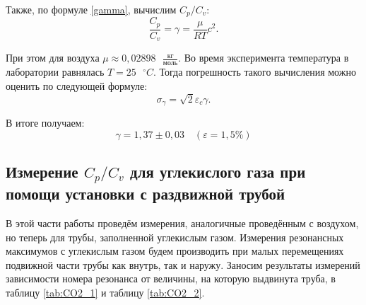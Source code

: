 \documentclass[a4paper, 12pt]{article}
\begin{document}
            \noindent Также, по формуле \eqref{gamma}, вычислим $ C_p/C_v $:
            \[ \frac{C_p}{C_v} = \gamma = \frac{\mu}{RT}c^2. \]
            
            \noindent При этом для воздуха $ \displaystyle \mu \approx 0,02898 \text{ } \frac{\text{кг}}{\text{моль}} $. Во время эксперимента температура в лаборатории равнялась $T = 25 \text{ } ^\circ C$. Тогда погрешность такого вычисления можно оценить по следующей формуле:
            \[ \sigma_\gamma = \sqrt{2}\varepsilon_c\gamma.\]
            
            \noindent В итоге получаем:
            \[ \boxed{\gamma = 1,37 \pm 0,03}\quad (\varepsilon=1,5\%) \]

        \subsection*{Измерение $C_p/C_v$ для углекислого газа при помощи установки с раздвижной трубой}
            
            \noindent В этой части работы проведём измерения, аналогичные проведённым с воздухом, но теперь для трубы, заполненной углекислым газом. Измерения резонансных максимумов с углекислым газом будем производить при малых перемещениях подвижной части трубы как внутрь, так и наружу. Заносим результаты измерений зависимости номера резонанса от величины, на которую выдвинута труба, в таблицу \ref{tab:CO2_1} и таблицу \ref{tab:CO2_2}.
\end{document}
